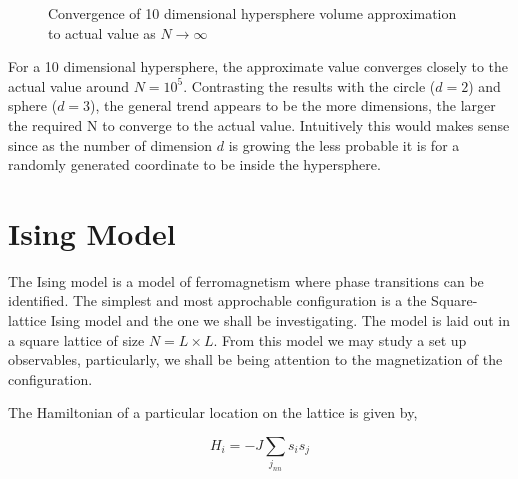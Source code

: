 \documentclass{article}
\begin{document}
\begin{figure}[H]
\centering
  \begin{center}
  \end{center}
  \caption{Convergence of 10 dimensional hypersphere volume approximation to actual value as $N\to \infty$}
  \label{fig:derivative}
\end{figure}

For a 10 dimensional hypersphere, the approximate value converges closely to the actual value around $N = 10^{5}$.
Contrasting the results with the circle ($d = 2$) and sphere ($d = 3$), the general trend appears to be the more
dimensions, the larger the required N to converge to the actual value. Intuitively this would makes sense since
as the number of dimension $d$ is growing the less probable it is for a randomly generated coordinate to be inside
the hypersphere.


\section{Ising Model}

The Ising model is a model of ferromagnetism where phase transitions can be identified. The simplest and most approchable
configuration is a the Square-lattice Ising model and the one we shall be investigating. The model is laid out in a square
lattice of size $N = L \times L$. From this model we may study a set up observables, particularly, we shall be being attention
to the magnetization of the configuration.

The Hamiltonian of a particular location on the lattice is given by,

\begin{equation} \label{eq:hamilltonian}
  H_{i} = -J\sum_{j_{nn}} s_{i}s_{j}
\end{equation}
\end{document}
